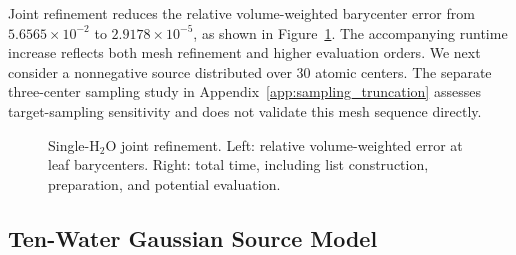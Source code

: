 \documentclass[a4paper,pdflatex,sn-mathphys-num]{sn-jnl}
\theoremstyle{thmstyleone}
\begin{document}
Joint refinement reduces the relative volume-weighted barycenter error from $5.6565\times10^{-2}$ to $2.9178\times10^{-5}$, as shown in Figure~\ref{fig:h2o_single_mesh_n_scaling}. The accompanying runtime increase reflects both mesh refinement and higher evaluation orders. We next consider a nonnegative source distributed over 30 atomic centers. The separate three-center sampling study in Appendix~\ref{app:sampling_truncation} assesses target-sampling sensitivity and does not validate this mesh sequence directly.

\begin{figure}[!htbp]
\centering
{}
\caption{Single-H$_2$O joint refinement. Left: relative volume-weighted
error at leaf barycenters. Right: total time, including list
construction, preparation, and potential evaluation.}
\label{fig:h2o_single_mesh_n_scaling}
\end{figure}

\subsection{Ten-Water Gaussian Source Model}
\label{sec:h2o_cluster_experiment}
\end{document}
